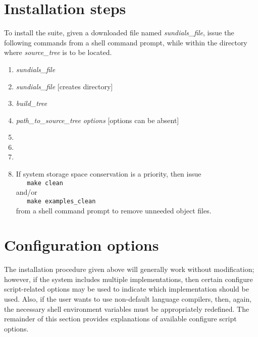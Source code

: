 \section{Installation steps}\label{ss:install_steps}

To install the {\sundials} suite, given a downloaded file named
{\em sundials\_file}, issue the following commands from
a shell command prompt, while within the directory where {\em source\_tree}
is to be located.  


\begin{enumerate}
\item {} {\em sundials\_file}
\item {} {\em sundials\_file}\hspace{2em} [creates 
      directory]
\item {} {\em build\_tree}
\item {\em path\_to\_source\_tree} {\em options}\hspace{2em}
      [options can be absent]
\item {}
\item {}
\item {}
\item If system storage space conservation is a priority, then issue \\
\verb+   make clean+ \\
and/or \\
\verb+   make examples_clean+ \\
from a shell command prompt to remove unneeded object files.
\end{enumerate}


\section{Configuration options}\label{ss:configuration_options}

The installation procedure given above will generally work without modification;
however, if the system includes multiple {\mpi} implementations, then certain
configure script-related options may be used to indicate which {\mpi}
implementation should be used. Also, if the user wants to use non-default
language compilers, then, again, the necessary shell environment variables must
be appropriately redefined.
The remainder of this section provides explanations of available configure script
options.


